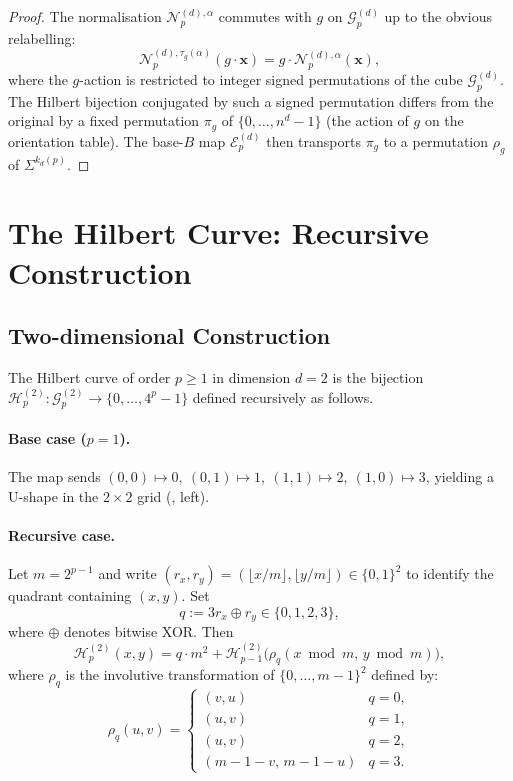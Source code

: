 \documentclass[11pt,a4paper]{article}
\theoremstyle{plain}
\theoremstyle{definition}
\theoremstyle{remark}
\newcommand{\Hil}{\mathcal{H}}
\newcommand{\Enc}{\mathcal{E}}
\newcommand{\Nor}{\mathcal{N}}
\newcommand{\Grid}{\mathcal{G}}
\begin{document}
\begin{proof}
The normalisation $\Nor_p^{(d),\alpha}$ commutes with $g$ on
$\Grid_p^{(d)}$ up to the obvious relabelling:
\[
\Nor_p^{(d),\tau_g(\alpha)}(g\cdot \mathbf{x})
= g\cdot \Nor_p^{(d),\alpha}(\mathbf{x}),
\]
where the $g$-action is restricted to integer signed permutations of
the cube $\Grid_p^{(d)}$. The Hilbert bijection conjugated by such a
signed permutation differs from the original by a fixed permutation
$\pi_g$ of $\{0,\dots,n^d-1\}$ (the action of $g$ on the orientation
table). The base-$B$ map $\Enc_p^{(d)}$ then transports $\pi_g$ to a
permutation $\rho_g$ of $\Sigma^{k_d(p)}$.
\end{proof}

\section{The Hilbert Curve: Recursive Construction}\label{sec:hilbert}

\subsection{Two-dimensional Construction}\label{sec:hilbert_2d}

The Hilbert curve of order $p\geq 1$ in dimension $d=2$ is the bijection
$\Hil_p^{(2)}:\Grid_p^{(2)}\to\{0,\dots,4^p-1\}$ defined recursively as follows.

\paragraph{Base case ($p=1$).} The map sends
$(0,0)\mapsto 0,\ (0,1)\mapsto 1,\ (1,1)\mapsto 2,\ (1,0)\mapsto 3$,
yielding a U-shape in the $2\times 2$ grid (, left).

\paragraph{Recursive case.} Let $m = 2^{p-1}$ and write
$(r_x,r_y)=(\lfloor x/m \rfloor,\lfloor y/m \rfloor)\in\{0,1\}^2$ to identify
the quadrant containing $(x,y)$. Set
\[ q := 3 r_x \oplus r_y \in \{0,1,2,3\}, \]
where $\oplus$ denotes bitwise XOR. Then
\begin{equation}\label{eq:hilbert2d}
\Hil_p^{(2)}(x,y) = q\cdot m^2 +
\Hil_{p-1}^{(2)}\bigl(\rho_q(x \bmod m,\, y \bmod m)\bigr),
\end{equation}
where $\rho_q$ is the involutive transformation of $\{0,\dots,m-1\}^2$
defined by:
\[
\rho_q(u,v) =
\begin{cases}
(v, u) & q = 0,\\
(u, v) & q = 1,\\
(u, v) & q = 2,\\
(m{-}1{-}v,\,m{-}1{-}u) & q = 3.
\end{cases}
\]
\end{document}
